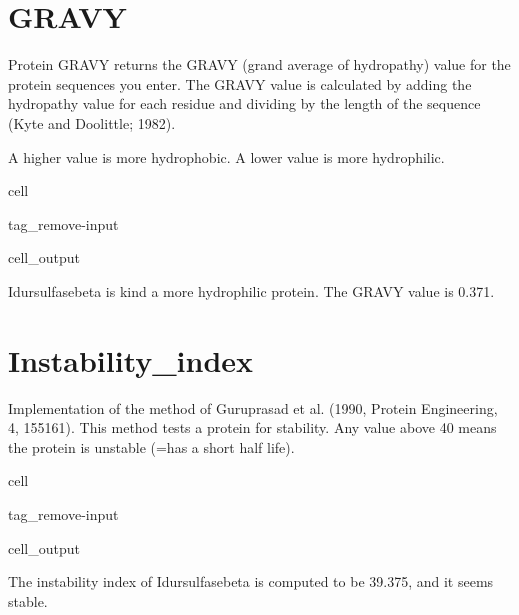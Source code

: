\documentclass[letterpaper,10pt,english]{jupyterBook}
\begin{document}
\section{GRAVY}
\label{\detokenize{ipynb/chapter1:gravy}}
\sphinxAtStartPar
Protein GRAVY returns the GRAVY (grand average of hydropathy) value for the protein sequences you enter. The GRAVY value is calculated by adding the hydropathy value for each residue and dividing by the length of the sequence (Kyte and Doolittle; 1982).

\sphinxAtStartPar
A higher value is more hydrophobic. A lower value is more hydrophilic.

\begin{sphinxuseclass}{cell}
\begin{sphinxuseclass}{tag_remove-input}\begin{sphinxVerbatimOutput}

\begin{sphinxuseclass}{cell_output}
\begin{sphinxVerbatim}[commandchars=\\\{\}]
Idursulfasebeta is kind a more hydrophilic protein. The GRAVY value is \PYGZhy{}0.371.
\end{sphinxVerbatim}

\end{sphinxuseclass}\end{sphinxVerbatimOutput}

\end{sphinxuseclass}
\end{sphinxuseclass}

\section{Instability\_index}
\label{\detokenize{ipynb/chapter1:instability-index}}
\sphinxAtStartPar
Implementation of the method of Guruprasad et al. (1990, Protein Engineering, 4, 155\sphinxhyphen{}161). This method tests a protein for stability. Any value above 40 means the protein is unstable (=has a short half life).

\begin{sphinxuseclass}{cell}
\begin{sphinxuseclass}{tag_remove-input}\begin{sphinxVerbatimOutput}

\begin{sphinxuseclass}{cell_output}
\begin{sphinxVerbatim}[commandchars=\\\{\}]
The instability index of Idursulfasebeta is computed to be 39.375, and it seems stable.
\end{sphinxVerbatim}

\end{sphinxuseclass}\end{sphinxVerbatimOutput}

\end{sphinxuseclass}
\end{sphinxuseclass}
\sphinxstepscope
\end{document}

